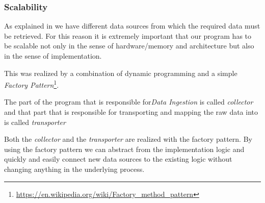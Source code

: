 \subsubsection{Scalability}
\label{subsubsec:scale}
As explained in  we have different data sources from which the required data must be retrieved.
For this reason it is extremely important that our program has to be scalable not only in the sense of hardware/memory and architecture but also in the sense of implementation.

This was realized by a combination of dynamic programming and a simple \textit{Factory Pattern}\footnote{\url{https://en.wikipedia.org/wiki/Factory_method_pattern}}.

The part of the program that is responsible for\textit{Data Ingestion} is called \textit{collector}
and that part that is responsible for transporting and mapping the raw data into \pg{} is called \textit{transporter}

Both the \textit{collector} and the \textit{transporter} are realized with the factory pattern.
By using the factory pattern we can abstract from the implementation logic and quickly and easily connect new data sources to the existing logic without changing anything in the underlying process.

%
